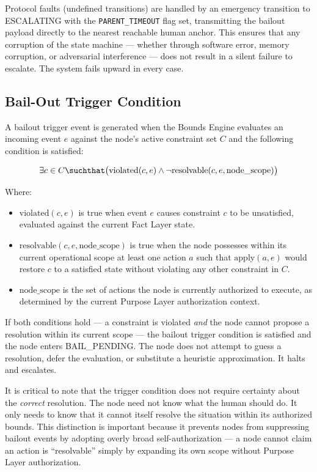 Protocol faults (undefined transitions) are handled by an emergency transition to ESCALATING with the \texttt{PARENT\_TIMEOUT} flag set, transmitting the bailout payload directly to the nearest reachable human anchor. This ensures that any corruption of the state machine — whether through software error, memory corruption, or adversarial interference — does not result in a silent failure to escalate. The system fails upward in every case.

\subsection{Bail-Out Trigger Condition}
\label{sec:bailout-trigger-condition}

A bailout trigger event is generated when the Bounds Engine evaluates an incoming event $e$ against the node's active constraint set $C$ and the following condition is satisfied:

\begin{equation}
\exists c \in C \suchthat \big( \text{violated}(c, e) \land \neg\text{resolvable}(c, e, \text{node\_scope}) \big)
\label{eq:bailout-trigger}
\end{equation}

Where:

\begin{itemize}
    \item $\text{violated}(c, e)$ is true when event $e$ causes constraint $c$ to be unsatisfied, evaluated against the current Fact Layer state.
    \item $\text{resolvable}(c, e, \text{node\_scope})$ is true when the node possesses within its current operational scope at least one action $a$ such that $\text{apply}(a, e)$ would restore $c$ to a satisfied state without violating any other constraint in $C$.
    \item $\text{node\_scope}$ is the set of actions the node is currently authorized to execute, as determined by the current Purpose Layer authorization context.
\end{itemize}

If both conditions hold — a constraint is violated \textit{and} the node cannot propose a resolution within its current scope — the bailout trigger condition is satisfied and the node enters BAIL\_PENDING. The node does not attempt to guess a resolution, defer the evaluation, or substitute a heuristic approximation. It halts and escalates.

It is critical to note that the trigger condition does not require certainty about the \textit{correct} resolution. The node need not know what the human should do. It only needs to know that it cannot itself resolve the situation within its authorized bounds. This distinction is important because it prevents nodes from suppressing bailout events by adopting overly broad self-authorization — a node cannot claim an action is ``resolvable'' simply by expanding its own scope without Purpose Layer authorization.


